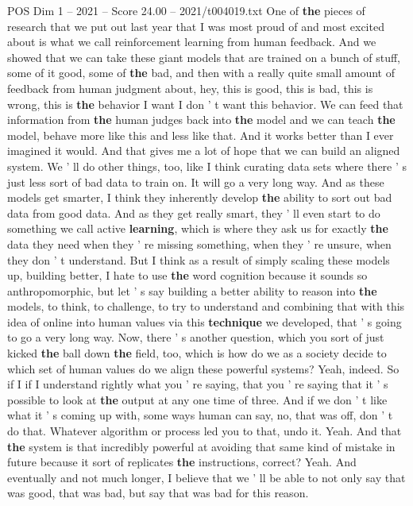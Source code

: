 \begin{textsample}{POS Dim 1 – 2021 – Score 24.00 – 2021/t004019.txt}
One of \textbf{the} pieces of research that we put out last year that I was most proud of and most excited about is what we call reinforcement learning from human feedback.
And we showed that we can take these giant models that are trained on a bunch of stuff, some of it good, some of \textbf{the} bad, and then with a really quite small amount of feedback from human judgment about, hey, this is good, this is bad, this is wrong, this is \textbf{the} behavior I want I don ' t want this behavior.
We can feed that information from \textbf{the} human judges back into \textbf{the} model and we can teach \textbf{the} model, behave more like this and less like that.
And it works better than I ever imagined it would.
And that gives me a lot of hope that we can build an aligned system.
We ' ll do other things, too, like I think curating data sets where there ' s just less sort of bad data to train on.
It will go a very long way.
And as these models get smarter, I think they inherently develop \textbf{the} ability to sort out bad data from good data.
And as they get really smart, they ' ll even start to do something we call active \textbf{learning}, which is where they ask us for exactly \textbf{the} data they need when they ' re missing something, when they ' re unsure, when they don ' t understand.
But I think as a result of simply scaling these models up, building better, I hate to use \textbf{the} word cognition because it sounds so anthropomorphic, but let ' s say building a better ability to reason into \textbf{the} models, to think, to challenge, to try to understand and combining that with this idea of online into human values via this \textbf{technique} we developed, that ' s going to go a very long way.
Now, there ' s another question, which you sort of just kicked \textbf{the} ball down \textbf{the} field, too, which is how do we as a society decide to which set of human values do we align these powerful systems?
Yeah, indeed.
So if I if I understand rightly what you ' re saying, that you ' re saying that it ' s possible to look at \textbf{the} output at any one time of three.
And if we don ' t like what it ' s coming up with, some ways human can say, no, that was off, don ' t do that.
Whatever algorithm or process led you to that, undo it.
Yeah.
And that \textbf{the} system is that incredibly powerful at avoiding that same kind of mistake in future because it sort of replicates \textbf{the} instructions, correct?
Yeah.
And eventually and not much longer, I believe that we ' ll be able to not only say that was good, that was bad, but say that was bad for this reason.

\end{textsample}
